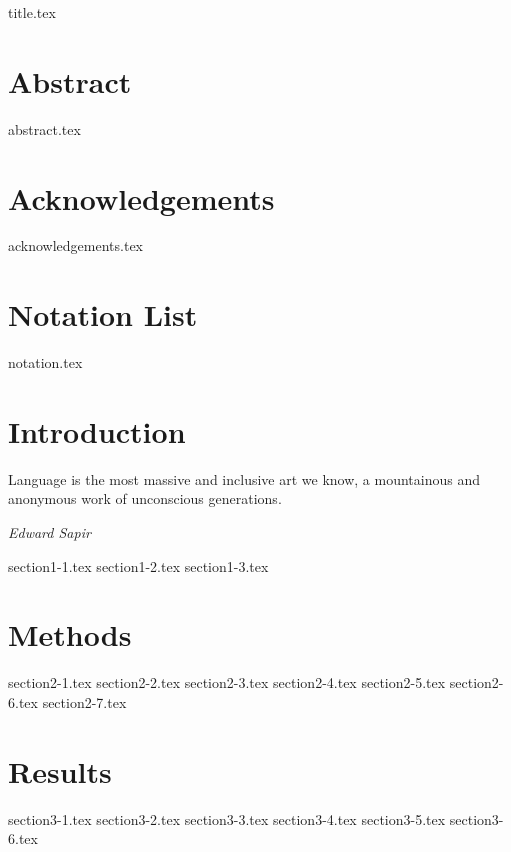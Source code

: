 \documentclass[a4paper,12pt,table,xcdraw]{book}
\begin{document}
\frontmatter

{title.tex}
\pagebreak
\clearpage
\thispagestyle{empty}

\setlength{\parskip}{\baselineskip}%
\setlength{\parindent}{0pt}%

\chapter{Abstract}
{abstract.tex}
\clearpage
\thispagestyle{empty}

\chapter{Acknowledgements}
{acknowledgements.tex}
\clearpage
\thispagestyle{empty}

\tableofcontents

\chapter{Notation List}
{notation.tex}

\mainmatter

\chapter{Introduction}
\epigraph{Language is the most massive and inclusive art we know, a mountainous and anonymous work of unconscious generations.}{\textit{Edward Sapir}}
{section1-1.tex}
{section1-2.tex}
{section1-3.tex}

\chapter{Methods} \label{ch:methods}
{section2-1.tex}
{section2-2.tex}
{section2-3.tex}
{section2-4.tex}
{section2-5.tex}
{section2-6.tex}
{section2-7.tex}

\chapter{Results}
{section3-1.tex}
{section3-2.tex}
{section3-3.tex}
{section3-4.tex}
{section3-5.tex}
{section3-6.tex}
\end{document}
